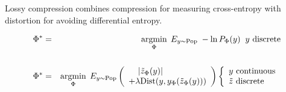 {

Lossy compression combines compression for measuring cross-entropy with distortion for avoiding differential entropy.

\vfill
{\color{red}
\begin{eqnarray*}
\Phi^* & = & \operatorname*{argmin}_\Phi \;E_{y \sim \mathrm{Pop}} \;-\ln P_\Phi(y)\;\;\mbox{$y$ discrete} \\
\\
\Phi^* & = & \operatorname*{argmin}_\Phi \;E_{y \sim \mathrm{Pop}}\left(\begin{array}{l} \;\;\;\;|\tilde{z}_\Phi(y)| \\ + \lambda \mathrm{Dist}(y,y_\Phi(\tilde{z}_\Phi(y))) \end{array}\right)
\left\{\begin{array}{l}\mbox{$y$ continuous} \\ \mbox{$\tilde{z}$ discrete}\end{array}\right.
\end{eqnarray*}
}


}


